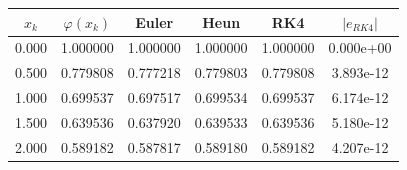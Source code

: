 \begin{tabular}{cccccc}
\toprule
$x_k$ & $\varphi(x_k)$ & Euler & Heun & RK4 & $|e_{RK4}|$ \\
\midrule
0.000 & 1.000000 & 1.000000 & 1.000000 & 1.000000 & 0.000e+00 \\
0.500 & 0.779808 & 0.777218 & 0.779803 & 0.779808 & 3.893e-12 \\
1.000 & 0.699537 & 0.697517 & 0.699534 & 0.699537 & 6.174e-12 \\
1.500 & 0.639536 & 0.637920 & 0.639533 & 0.639536 & 5.180e-12 \\
2.000 & 0.589182 & 0.587817 & 0.589180 & 0.589182 & 4.207e-12 \\
\bottomrule
\end{tabular}